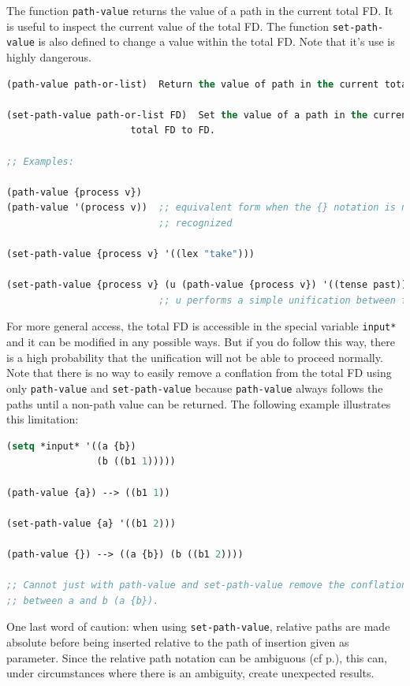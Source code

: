 \documentclass[10pt,a4paper]{report}
\begin{document}
The function {\tt path-value} returns the value of a path in the current total
FD.  It is useful to inspect the current value of the total FD.  The
function {\tt set-path-value} is also defined to change a value within the
total FD.  Note that it's use is highly dangerous.

\begin{lstlisting}[language=Lisp]
(path-value path-or-list)  Return the value of path in the current total FD.

(set-path-value path-or-list FD)  Set the value of a path in the current 
			          total FD to FD.  

;; Examples:

(path-value {process v})
(path-value '(process v))  ;; equivalent form when the {} notation is not
                           ;; recognized 

(set-path-value {process v} '((lex "take")))

(set-path-value {process v} (u (path-value {process v}) '((tense past))))
                           ;; u performs a simple unification between fds.

\end{lstlisting}

 
For more general access, the total FD is accessible in the special variable
{\tt *input*} and it can be modified in any possible ways.  But if you do
follow this way, there is a high probability that the unification will not
be able to proceed normally.  Note that there is no way to easily remove a
conflation from the total FD using only {\tt path-value} and {\tt set-path-value}
because {\tt path-value} always follows the paths until a non-path value can
be returned.  The following example illustrates this limitation:

\begin{lstlisting}[language=Lisp] 
(setq *input* '((a {b})
                (b ((b1 1)))))

(path-value {a}) --> ((b1 1))

(set-path-value {a} '((b1 2)))

(path-value {}) --> ((a {b}) (b ((b1 2))))

;; Cannot just with path-value and set-path-value remove the conflation
;; between a and b (a {b}).
\end{lstlisting}

One last word of caution: when using {\tt set-path-value}, relative paths are
made absolute before being inserted relative to the path of insertion given
as parameter.  Since the relative path notation can be ambiguous (cf
p.\pageref{relpath-ambiguity}), this can, under circumstances where there
is an ambiguity, create unexpected results.  
\end{document}
